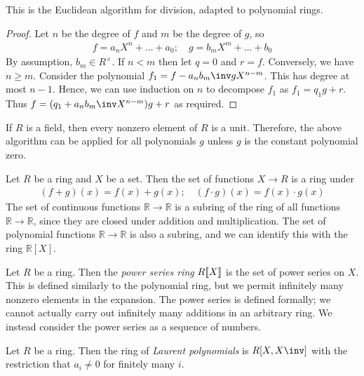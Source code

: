\begin{remark}
	This is the Euclidean algorithm for division, adapted to polynomial rings.
\end{remark}
\begin{proof}
	Let $n$ be the degree of $f$ and $m$ be the degree of $g$, so
	\begin{align*}
		f = a_n X^n + \dots + a_0;\quad g = b_m X^m + \dots + b_0
	\end{align*}
	By assumption, $b_m \in R^\times$.
	If $n < m$ then let $q = 0$ and $r = f$.
	Conversely, we have $n \geq m$.
	Consider the polynomial $f_1 = f - a_n b_m\inv g X^{n-m}$.
	This has degree at most $n - 1$.
	Hence, we can use induction on $n$ to decompose $f_1$ as $f_1 = q_1 g + r$.
	Thus $f = (q_1 + a_n b_m\inv X^{n-m}) g + r$ as required.
\end{proof}
\begin{remark}
	If $R$ is a field, then every nonzero element of $R$ is a unit.
	Therefore, the above algorithm can be applied for all polynomials $g$ unless $g$ is the constant polynomial zero.
\end{remark}
\begin{example}
	Let $R$ be a ring and $X$ be a set.
	Then the set of functions $X \to R$ is a ring under
	\begin{align*}
		(f + g)(x) = f(x) + g(x);\quad (f \cdot g)(x) = f(x) \cdot g(x)
	\end{align*}
	The set of continuous functions $\mathbb R \to \mathbb R$ is a subring of the ring of all functions $\mathbb R \to \mathbb R$, since they are closed under addition and multiplication.
	The set of polynomial functions $\mathbb R \to \mathbb R$ is also a subring, and we can identify this with the ring $\mathbb R[X]$.
\end{example}
\begin{example}
	Let $R$ be a ring.
	Then the \textit{power series ring} $R[\![X]\!]$ is the set of power series on $X$.
	This is defined similarly to the polynomial ring, but we permit infinitely many nonzero elements in the expansion.
	The power series is defined formally; we cannot actually carry out infinitely many additions in an arbitrary ring.
	We instead consider the power series as a sequence of numbers.
\end{example}
\begin{example}
	Let $R$ be a ring.
	Then the ring of \textit{Laurent polynomials} is $R[X,X\inv]$ with the restriction that $a_i \neq 0$ for finitely many $i$.
\end{example}

